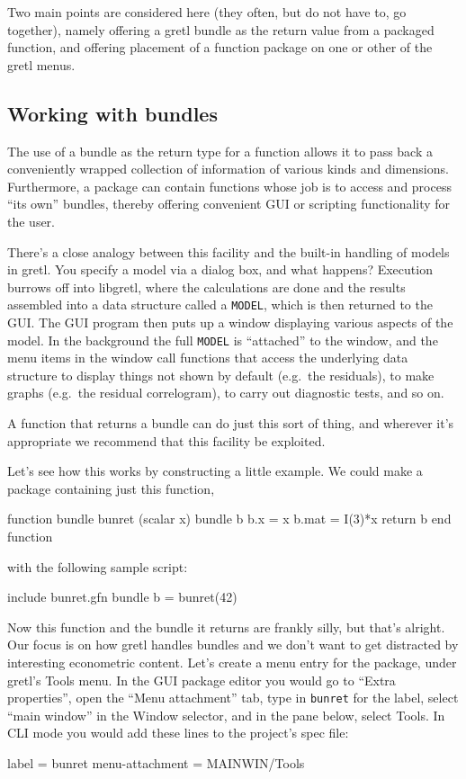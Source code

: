 \documentclass[oneside]{book}
\begin{document}
Two main points are considered here (they often, but do not have to,
go together), namely offering a gretl bundle as the return value from
a packaged function, and offering placement of a function package on
one or other of the gretl menus.

\subsection{Working with bundles}

The use of a bundle as the return type for a function allows it to
pass back a conveniently wrapped collection of information of various
kinds and dimensions. Furthermore, a package can contain functions
whose job is to access and process ``its own'' bundles, thereby
offering convenient GUI or scripting functionality for the user.

There's a close analogy between this facility and the built-in
handling of models in gretl. You specify a model via a dialog box, and
what happens? Execution burrows off into libgretl, where the
calculations are done and the results assembled into a data structure
called a \texttt{MODEL}, which is then returned to the GUI. The GUI
program then puts up a window displaying various aspects of the
model. In the background the full \texttt{MODEL} is ``attached'' to
the window, and the menu items in the window call functions that
access the underlying data structure to display things not shown by
default (e.g.\ the residuals), to make graphs (e.g.\ the residual
correlogram), to carry out diagnostic tests, and so on.

A function that returns a bundle can do just this sort of thing, and
wherever it's appropriate we recommend that this facility be
exploited.

Let's see how this works by constructing a little example. We could
make a package containing just this function,
%
\begin{code}
function bundle bunret (scalar x)
  bundle b
  b.x = x
  b.mat = I(3)*x
  return b
end function
\end{code}
%
with the following sample script:
%
\begin{code}
include bunret.gfn
bundle b = bunret(42)
\end{code}

Now this function and the bundle it returns are frankly silly, but
that's alright. Our focus is on how gretl handles bundles and we don't
want to get distracted by interesting econometric content. Let's
create a menu entry for the package, under gretl's \textsf{Tools}
menu. In the GUI package editor you would go to ``Extra properties'',
open the ``Menu attachment'' tab, type in \texttt{bunret} for the
label, select ``main window'' in the Window selector, and in the pane
below, select Tools. In CLI mode you would add these lines to the
project's \textsf{spec} file:
%
\begin{code}
label = bunret
menu-attachment = MAINWIN/Tools
\end{code}
\end{document}

